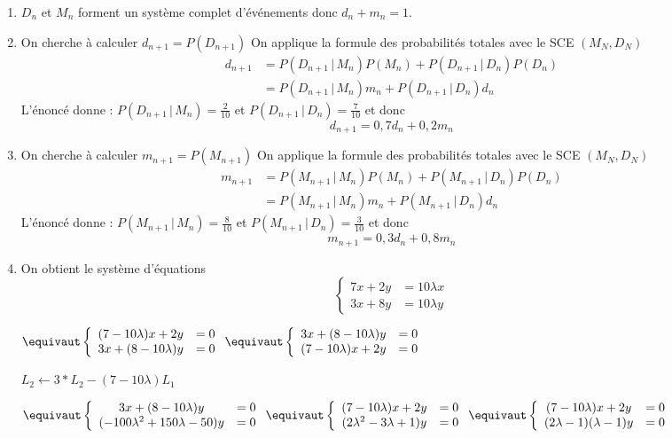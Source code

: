 \documentclass[a4paper, 11pt,reqno]{article}
\begin{document}
\begin{correction}
\begin{enumerate}
\item $D_n$ et $M_n$ forment un système complet d'événements donc $
d_n+m_n=1$. 
\item On cherche à calculer $d_{n+1} =P(D_{n+1})$ 
On applique la formule des probabilités totales avec le SCE $(M_N,D_N)$
\begin{align*}
d_{n+1} &= P(D_{n+1}\, |\, M_n) P(M_n) +P(D_{n+1}\, |\, D_n) P(D_n)\\
			&= P(D_{n+1}\, |\, M_n) m_n +P(D_{n+1}\, |\, D_n) d_n
\end{align*}
L'énoncé donne : $ P(D_{n+1}\, |\, M_n) = \frac{2}{10}$ et  $ P(D_{n+1}\, |\, D_n) = \frac{7}{10}$
et donc 
$$d_{n+1} = 0,7 d_n  +0,2 m_n$$

\item On cherche à calculer $m_{n+1} =P(M_{n+1})$ 
On applique la formule des probabilités totales avec le SCE $(M_N,D_N)$
\begin{align*}
m_{n+1} &= P(M_{n+1}\, |\, M_n) P(M_n) +P(M_{n+1}\, |\, D_n) P(D_n)\\
			&= P(M_{n+1}\, |\, M_n) m_n +P(M_{n+1}\, |\, D_n) d_n
\end{align*}
L'énoncé donne : $ P(M_{n+1}\, |\, M_n) = \frac{8}{10}$ et  $ P(M_{n+1}\, |\, D_n) = \frac{3}{10}$
et donc 
$$m_{n+1} = 0,3 d_n  +0,8 m_n$$

\item 
On obtient le système d'équations
$$\left\{  
\begin{array}{cc}
7x +2y  &=10\lambda x\\
3x +8y  &=10\lambda y
\end{array}\right.$$



$
\equivaut
\left\{  
\begin{array}{cc}
(7-10\lambda) x +2y  &=0\\
3x +(8-10\lambda)y  &=0
\end{array}\right.
\equivaut 
\left\{  
\begin{array}{cc}
3x +(8-10\lambda)y  &=0\\
(7-10\lambda) x +2y  &=0
\end{array}\right.$

$L_2 \leftarrow3*L_2- (7-10\lambda)L_1$

$
\equivaut 
\left\{  
\begin{array}{cc}
3x +(8-10\lambda)y  &=0\\
(-100\lambda^2 +150\lambda -50 )y  &=0
\end{array}\right.
\equivaut
\left\{  
\begin{array}{cc}
(7-10\lambda) x +2y  &=0\\
(2\lambda^2 -3\lambda +1) y  &=0
\end{array}\right.
\equivaut
\left\{  
\begin{array}{cc}
(7-10\lambda) x +2y  &=0\\
(2\lambda-1)(\lambda-1) y  &=0
\end{array}\right.
$


\end{enumerate}
\end{correction}
\end{document}

